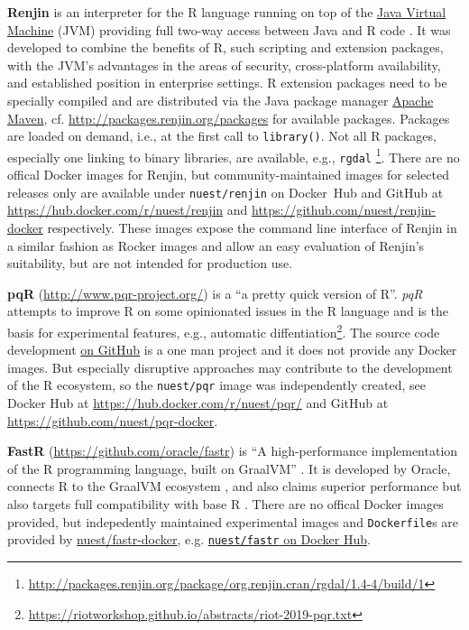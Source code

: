 \textbf{Renjin} is an interpreter for the R language running on top of
the \href{https://en.wikipedia.org/wiki/Java_virtual_machine}{Java
Virtual Machine} (JVM) providing full two-way access between Java and R
code \citep{wikipedia_renjin_2018}. It was developed to combine the
benefits of R, such scripting and extension packages, with the JVM's
advantages in the areas of security, cross-platform availability, and
established position in enterprise settings. R extension packages need
to be specially compiled and are distributed via the Java package
manager \href{https://en.wikipedia.org/wiki/Apache_Maven}{Apache Maven},
cf. \url{http://packages.renjin.org/packages} for available packages.
Packages are loaded on demand, i.e., at the first call to
\texttt{library()}. Not all R packages, especially one linking to binary
libraries, are available, e.g., \texttt{rgdal}
\footnote{\href{http://packages.renjin.org/package/org.renjin.cran/rgdal/1.4-4/build/1}{http://packages.renjin.org/package/org.renjin.cran/rgdal/1.4-4/build/1}}.
There are no offical Docker images for Renjin, but community-maintained
images for selected releases only are available under
\texttt{nuest/renjin} on Docker~Hub and GitHub at
\url{https://hub.docker.com/r/nuest/renjin} and
\url{https://github.com/nuest/renjin-docker} respectively. These images
expose the command line interface of Renjin in a similar fashion as
Rocker images and allow an easy evaluation of Renjin's suitability, but
are not intended for production use.

\textbf{pqR} (\url{http://www.pqr-project.org/}) is a ``a pretty quick
version of R''. \emph{pqR} attempts to improve R on some opinionated
issues in the R language and is the basis for experimental features,
e.g., automatic
diffentiation\footnote{\href{https://riotworkshop.github.io/abstracts/riot-2019-pqr.txt}{https://riotworkshop.github.io/abstracts/riot-2019-pqr.txt}}.
The source code development
\href{https://github.com/radfordneal/pqR/}{on GitHub} is a one man
project and it does not provide any Docker images. But especially
disruptive approaches may contribute to the development of the R
ecosystem, so the \texttt{nuest/pqr} image was independently created,
see Docker Hub at \url{https://hub.docker.com/r/nuest/pqr/} and GitHub
at \url{https://github.com/nuest/pqr-docker}.

\textbf{FastR} (\url{https://github.com/oracle/fastr}) is ``A
high-performance implementation of the R programming language, built on
GraalVM'' \citep{oracle_labs_oraclefastr_2020}. It is developed by
Oracle, connects R to the GraalVM ecosystem
\citep{wikipedia_graalvm_2019}, and also claims superior performance but
also targets full compatibility with base R
\citep{oracle_labs_oraclefastr_2020}. There are no offical Docker images
provided, but indepedently maintained experimental images and
\texttt{Dockerfile}s are provided by
\href{https://github.com/nuest/fastr-docker}{nuest/fastr-docker}, e.g.
\href{https://cloud.docker.com/repository/docker/nuest/fastr/}{\texttt{nuest/fastr}
on Docker Hub}.

